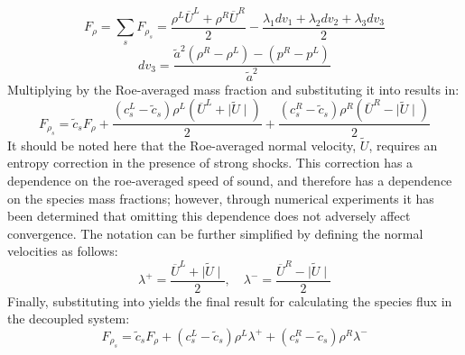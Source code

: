 \begin{equation}
\label{total-mass}
	F_\rho = \sum\limits_{s}{F_{\rho_s}} = \frac{\rho^L\overline{U}^L+\rho^R\overline{U}^R}{2}
	-\frac{\lambda_1 dv_1 + \lambda_2 dv_2 +\lambda_3 dv_3}{2}
\end{equation}
\begin{equation}
	dv_3 = \frac{\tilde{a}^2 (\rho^R-\rho^L)-(p^R-p^L)}{\tilde{a}^2}
\end{equation}
Multiplying  by the Roe-averaged mass fraction and
substituting it into  results in:
\begin{equation}
\label{unsimp-sp-flux}
	F_{\rho_s} =\tilde{c}_s F_\rho + \frac{(c_s^L-\tilde{c}_s)\rho^L(\overline{U}^L+\mid \tilde{U}\mid)}{2}
	+ \frac{(c_s^R-\tilde{c}_s)\rho^R(\overline{U}^R-\mid \tilde{U}\mid)}{2}
\end{equation}
It should be noted here that the Roe-averaged normal velocity, $\tilde{U}$,
requires an entropy correction in the presence of strong shocks\cite{harten}.
This correction has a dependence on the roe-averaged speed of sound, and
therefore has a dependence on the species mass fractions; however,
through numerical experiments it has been determined that omitting this
dependence does not adversely affect convergence.  The notation can be further
simplified by defining the normal velocities as follows:
\begin{equation}
  \lambda^+ = \frac{\overline{U}^L+\mid \tilde{U}\mid}{2}, \quad 
  \lambda^- = \frac{\overline{U}^R-\mid \tilde{U}\mid}{2} 
  \label{lambda-pm} 
\end{equation}
Finally, substituting  into  yields the
final result for calculating the species flux in the decoupled system:
\begin{equation}
  F_{\rho_s} =
  \tilde{c}_s F_\rho 
  + (c_s^L-\tilde{c}_s)\rho^L\lambda^+ 
  + (c_s^R-\tilde{c}_s)\rho^R\lambda^-
  \label{sp-flux} 
\end{equation}
